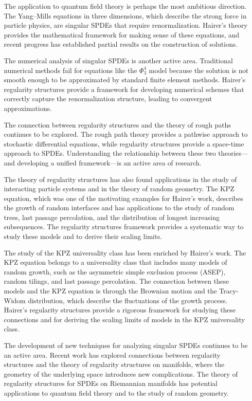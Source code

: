 The application to quantum field theory is perhaps the most ambitious direction. The Yang--Mills equations in three dimensions, which describe the strong force in particle physics, are singular SPDEs that require renormalization. Hairer's theory provides the mathematical framework for making sense of these equations, and recent progress has established partial results on the construction of solutions.

The numerical analysis of singular SPDEs is another active area. Traditional numerical methods fail for equations like the $\Phi^4_3$ model because the solution is not smooth enough to be approximated by standard finite element methods. Hairer's regularity structures provide a framework for developing numerical schemes that correctly capture the renormalization structure, leading to convergent approximations.

The connection between regularity structures and the theory of rough paths continues to be explored. The rough path theory provides a pathwise approach to stochastic differential equations, while regularity structures provide a space-time approach to SPDEs. Understanding the relationship between these two theories---and developing a unified framework---is an active area of research.

The theory of regularity structures has also found applications in the study of interacting particle systems and in the theory of random geometry. The KPZ equation, which was one of the motivating examples for Hairer's work, describes the growth of random interfaces and has applications to the study of random trees, last passage percolation, and the distribution of longest increasing subsequences. The regularity structures framework provides a systematic way to study these models and to derive their scaling limits.

The study of the KPZ universality class has been enriched by Hairer's work. The KPZ equation belongs to a universality class that includes many models of random growth, such as the asymmetric simple exclusion process (ASEP), random tilings, and last passage percolation. The connection between these models and the KPZ equation is through the Brownian motion and the Tracy-Widom distribution, which describe the fluctuations of the growth process. Hairer's regularity structures provide a rigorous framework for studying these connections and for deriving the scaling limits of models in the KPZ universality class.

The development of new techniques for analyzing singular SPDEs continues to be an active area. Recent work has explored connections between regularity structures and the theory of regularity structures on manifolds, where the geometry of the underlying space introduces new complications. The theory of regularity structures for SPDEs on Riemannian manifolds has potential applications to quantum field theory and to the study of random geometry.

